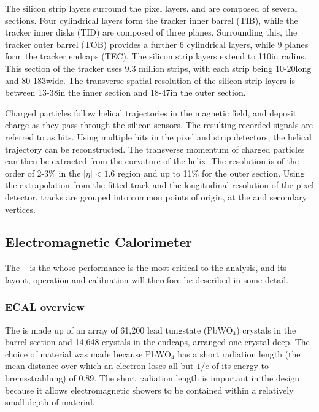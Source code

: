 The silicon strip layers surround the pixel layers, and are composed of several sections. Four cylindrical layers form the tracker inner barrel (TIB), while the tracker inner disks (TID) are composed of three planes. Surrounding this, the tracker outer barrel (TOB) provides a further 6 cylindrical layers, while 9 planes form the tracker endcaps (TEC). The silicon strip layers extend to 110\cm in radius. This section of the tracker uses 9.3 million strips, with each strip being 10-20\cm long and 80-183\um wide. The transverse spatial resolution of the silicon strip layers is between 13-38\um in the inner section and 18-47\um in the outer section.~\cite{trackerperformance2014}

Charged particles follow helical trajectories in the \CMS magnetic field, and deposit charge as they pass through the silicon sensors. The resulting recorded signals are referred to as hits. Using multiple hits in the pixel and strip detectors, the helical trajectory can be reconstructed. The transverse momentum \pT of charged particles can then be extracted from the curvature of the helix. The \pT resolution is of the order of 2-3\% in the $|\eta|<1.6$ region and up to 11\% for the outer section. Using the extrapolation from the fitted track and the longitudinal resolution of the pixel detector, tracks are grouped into common points of origin, at the \PV and secondary vertices. 

\subsection{Electromagnetic Calorimeter}
\label{sec:cms:ecal}

The \ECAL~\cite{CMSTDR,CMSEcalTDR} is the \subdetector whose performance is the most critical to the \Hgg analysis, and its layout, operation and calibration will therefore be described in some detail. 

\subsubsection{ECAL overview}
\label{sec:cms:ecal:overview}

The \ECAL is made up of an array of 61,200 lead tungstate (PbWO$_4$) crystals in the barrel section and 14,648 crystals in the endcaps, arranged one crystal deep. The choice of material was made because PbWO$_4$ has a short radiation length (the mean distance over which an electron loses all but $1/e$ of its energy to bremsstrahlung) of 0.89\cm. The short radiation length is important in the \ECAL design because it allows electromagnetic showers to be contained within a relatively small depth of material. 

